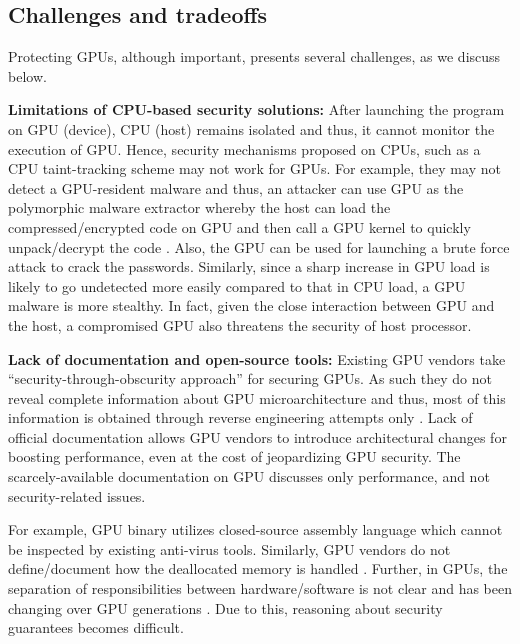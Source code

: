 \subsection{Challenges and tradeoffs}\label{sec:challengesandtradeoffs}
Protecting GPUs, although important, presents several challenges, as we discuss below.  

\textbf{Limitations of CPU-based security solutions:} After launching the program on GPU (device), CPU (host) remains isolated and thus, it cannot monitor the execution of GPU. Hence, security mechanisms proposed on CPUs, such as a CPU taint-tracking scheme may not work for GPUs. For example, they may not detect a GPU-resident malware and thus, an attacker can use GPU as the polymorphic malware extractor whereby  the host can load the compressed/encrypted code on GPU and then call a GPU kernel to quickly unpack/decrypt the code \cite{patterson2013vulnerability}. Also, the GPU can be used for launching a brute force attack to crack the passwords. Similarly, since a sharp increase in GPU load is likely to go undetected more easily  compared to that in CPU load, a GPU malware is more stealthy. In fact, given the close interaction between GPU and the host, a compromised GPU also threatens the security of  host processor. 

\textbf{Lack of documentation and open-source tools:} Existing GPU vendors take ``security-through-obscurity approach'' for securing GPUs. As such they do not reveal complete information about GPU microarchitecture and thus, most of this information is obtained  through reverse engineering attempts only \cite{black2010cubar,envytools,naghibijouybari2017constructing}. Lack of official documentation allows GPU vendors to introduce architectural changes for boosting performance, even at the cost of jeopardizing GPU security. The scarcely-available documentation on GPU discusses only performance, and not security-related issues. 

For example, GPU binary utilizes closed-source assembly language which cannot be inspected by existing anti-virus tools. Similarly, GPU vendors do not define/document how the deallocated memory is handled  \cite{pietro2016cuda}.  Further, in GPUs, the separation of responsibilities between hardware/software is not clear and has been changing over GPU generations \cite{zhu2017understanding}. Due to this, reasoning about security guarantees becomes difficult. 


